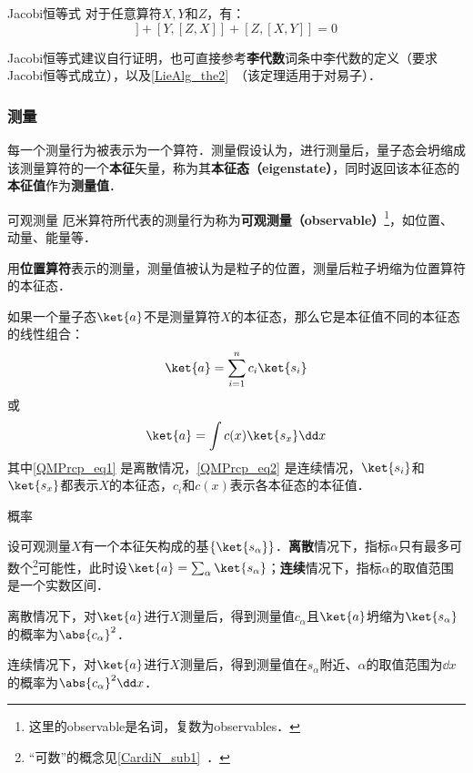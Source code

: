 \begin{theorem}{Jacobi恒等式}
对于任意算符$X, Y$和$Z$，有：
\begin{equation}
[X, [Y, Z]]+[Y, [Z, X]]+[Z, [X, Y]]=0
\end{equation}
\end{theorem}

Jacobi恒等式建议自行证明，也可直接参考\textbf{李代数}词条中李代数的定义（要求Jacobi恒等式成立），以及\autoref{LieAlg_the2}~（该定理适用于对易子）．







\subsubsection{测量}

每一个测量行为被表示为一个算符．测量假设认为，进行测量后，量子态会坍缩成该测量算符的一个\textbf{本征}矢量，称为其\textbf{本征态（eigenstate）}，同时返回该本征态的\textbf{本征值}作为\textbf{测量值}．


\begin{definition}{可观测量}\label{QMPrcp_def14}
厄米算符所代表的测量行为称为\textbf{可观测量（observable）}\footnote{这里的observable是名词，复数为observables．}，如位置、动量、能量等．
\end{definition}


\begin{example}{}
用\textbf{位置算符}表示的测量，测量值被认为是粒子的位置，测量后粒子坍缩为位置算符的本征态．
\end{example}

如果一个量子态$\ket{a}$不是测量算符$X$的本征态，那么它是本征值不同的本征态的线性组合：
\begin{equation}\label{QMPrcp_eq1}
\ket{a} = \sum_{i=1}^{n} c_i\ket{s_i}
\end{equation}
或
\begin{equation}\label{QMPrcp_eq2}
\ket{a} = \int c(x)\ket{s_x}\dd x
\end{equation}
其中\autoref{QMPrcp_eq1} 是离散情况，\autoref{QMPrcp_eq2} 是连续情况，$\ket{s_i}$和$\ket{s_x}$都表示$X$的本征态，$c_i$和$c(x)$表示各本征态的本征值．

\begin{definition}{概率}\label{QMPrcp_def15}

设可观测量$X$有一个本征矢构成的基$\{\ket{s_\alpha}\}$．\textbf{离散}情况下，指标$\alpha$只有最多可数个\footnote{“可数”的概念见\autoref{CardiN_sub1}~．}可能性，此时设$\ket{a}=\sum_{\alpha}\ket{s_\alpha}$；\textbf{连续}情况下，指标$\alpha$的取值范围是一个实数区间．

离散情况下，对$\ket{a}$进行$X$测量后，得到测量值$c_\alpha$且$\ket{a}$坍缩为$\ket{s_\alpha}$的概率为$\abs{c_\alpha}^2$．

连续情况下，对$\ket{a}$进行$X$测量后，得到测量值在$s_{\alpha}$附近、$\alpha$的取值范围为$\dd x$的概率为$\abs{c_\alpha}^2\dd x$．
\end{definition}


